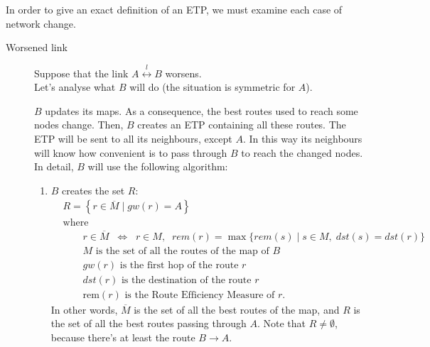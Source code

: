\documentclass[a4paper]{article}
\newcommand{\T}[1]{\textrm{#1}}
\newcommand{\pgra}[1]{\left\{#1\right\}}
\newcommand{\eal}[1]{{\begin{align*} #1 \end{align*}}}
\def\ove#1{{\overline{#1}}}
\newcommand{\qq}{\qquad}
\def\0{{\emptyset}}
\def\={{\;\Leftrightarrow\;}}
\begin{document}
In order to give an exact definition of an ETP, we must examine each case of network change.
\begin{description}
	\item[Worsened link] 
		\label{wlink}
		Suppose that the link $A
		\stackrel{l}{\leftrightarrow} B$ worsens.\\
		Let's analyse what $B$ will do (the situation is symmetric for
		$A$).

		$B$ updates its maps. As a consequence, the best routes used to
		reach some nodes change. Then, $B$ creates an ETP containing
		all these routes.
		The ETP will be sent to all its neighbours, except $A$. In
		this way its neighbours will know how convenient is to pass
		through $B$ to reach the changed nodes.
		In detail, $B$ will use the following algorithm:
		\begin{enumerate}
		\item \label{stepR} 
			$B$ creates the set $R$:
			\eal{
			&R=\pgra{r\in \overline{M}\;|\; gw(r)=A}\\
			&\T{where }\\
			&\qq r\in \ove M \;\= \;r\in M,\;\;  rem(r)=\max \{
			rem(s)
			\;|\;s\in M,\;dst(s)=dst(r) \} \\
			&\qq M \T{ is the set of all the routes of the map of
			$B$}\\
			&\qq gw(r)\T{ is the first hop of the route $r$}\\
			&\qq dst(r) \T{ is the destination of the route $r$}\\
			&\qq \T{rem}(r) \T{ is the Route Efficiency Measure of
			$r$}.
			}
			In other words, $\ove M$ is the set of all the best routes of
			the map, and $R$ is the set of all the best routes passing
			through $A$. Note that $R\neq \0$, because there's at
			least the route $B\rightarrow A$.
			

\end{enumerate}
\end{description}
\end{document}
